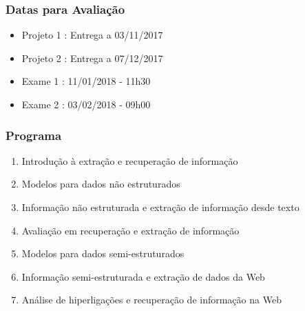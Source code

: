 \documentclass{beamer}
\begin{document}
\begin{frame} 
    \frametitle{Datas para Avaliação}
    \begin{itemize}
	\item Projeto 1 : Entrega a 03/11/2017 
	\item Projeto 2 : Entrega a 07/12/2017
    \item Exame 1 : 11/01/2018 - 11h30
    \item Exame 2 : 03/02/2018 - 09h00
    \end{itemize}
\end{frame}


\begin{frame} 
    \frametitle{Programa}
    \begin{enumerate}
    \footnotesize
	\item Introdução à extração e recuperação de informação 
	\item Modelos para dados não estruturados 
	\item Informação não estruturada e extração de informação desde texto 
	\item Avaliação em recuperação e extração de informação 
	\item Modelos para dados semi-estruturados 
	\item Informação semi-estruturada e extração de dados da Web 
	\item Análise de hiperligações e recuperação de informação na Web 

\end{enumerate}
\end{frame}
\end{document}
